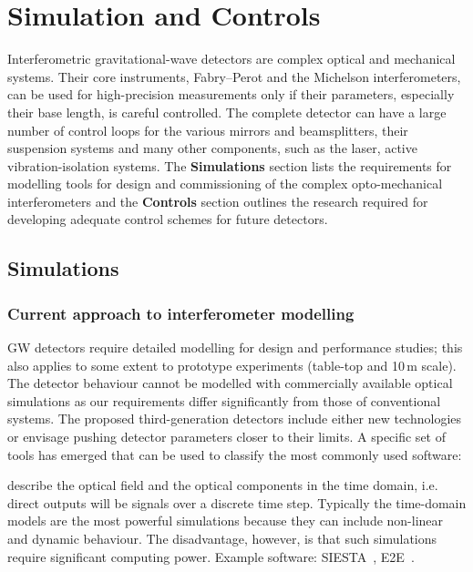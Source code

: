 \chapter{Simulation and Controls}
\label{sec:Sim_Controls}

Interferometric gravitational-wave detectors are complex optical and mechanical systems. Their core instruments, Fabry–Perot and the Michelson interferometers, can be used for high-precision measurements only if their parameters, especially their base length, is careful controlled. 
The complete detector can have a large number of control loops for the various mirrors and beamsplitters, their suspension systems and many other components, such as the laser, active vibration-isolation systems. The \textbf{Simulations} section lists the requirements for modelling tools for design and commissioning of the complex opto-mechanical interferometers and the \textbf{Controls} section outlines the research required for developing adequate control schemes for future detectors.

\section{Simulations}
\subsection{Current approach to interferometer modelling}
GW detectors require detailed modelling for design and performance studies; this also applies to some extent to prototype experiments (table-top and 10\,m scale). The detector behaviour cannot be modelled with commercially available optical simulations as our requirements differ significantly from those of conventional systems. The proposed third-generation detectors include either new technologies or envisage pushing detector parameters closer to their limits. 
A specific set of tools has emerged that can be used to classify the most commonly used software:

 describe the optical field and the optical components in the time domain, i.e. direct outputs will be signals over a discrete time step. Typically the time-domain models are the most powerful   simulations because they can include non-linear and dynamic behaviour.
The disadvantage, however, is that such simulations require significant computing power. Example software: SIESTA~\cite{SIESTA}, E2E~\cite{e2e_2000}.

